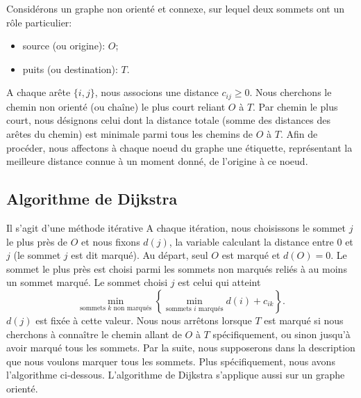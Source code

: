 Considérons un graphe non orienté et connexe, sur lequel deux sommets ont un rôle particulier:
\begin{itemize}
 \item
  source (ou origine): $O$;
 \item
  puits (ou destination): $T$.
\end{itemize}
A chaque arête $\lbrace i,j \rbrace$, nous associons une distance $c_{ij} \geq 0$.
Nous cherchons le chemin non orienté (ou chaîne) le plus court reliant $O$ à $T$.
Par chemin le plus court, nous désignons celui dont la distance totale (somme des distances des arêtes du chemin) est minimale parmi tous les chemins de $O$ à $T$.
Afin de procéder, nous affectons à chaque noeud du graphe une étiquette, représentant la meilleure distance  connue à un moment donné, de l'origine à ce noeud.

\subsection{Algorithme de Dijkstra}

Il s'agit d'une méthode itérative
A chaque itération, nous choisissons le sommet $j$ le plus près de $O$ et nous fixons $d(j)$, la variable calculant la distance entre $0$ et $j$
(le sommet $j$ est dit marqué).
Au départ, seul $O$ est marqué et $d(O) = 0$.
Le sommet le plus près est choisi parmi les sommets non marqués reliés à au moins un sommet marqué.
Le sommet choisi $j$ est celui qui atteint
\[
\min_{\mbox{sommets $k$ non marqués}} \left\lbrace \min_{\mbox{sommets $i$ marqués}} d(i) + c_{ik} \right\rbrace.
\]
$d(j)$ est fixée à cette valeur.
Nous nous arrêtons lorsque $T$ est marqué si nous cherchons à connaître le chemin allant de $O$ à $T$ spécifiquement, ou sinon jusqu'à avoir marqué tous les sommets.
Par la suite, nous supposerons dans la description que nous voulons marquer tous les sommets.
Plus spécifiquement, nous avons l'algorithme ci-dessous.
L'algorithme de Dijkstra s'applique aussi sur un graphe orienté.

